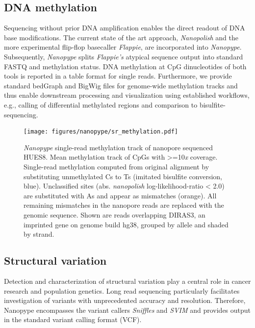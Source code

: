 \subsection{DNA methylation}
\label{subsec:nanopype:methylation}
Sequencing without prior DNA amplification enables the direct readout of DNA base modifications. The current state of the art approach, \textit{Nanopolish} \cite{Simpson2017} and the more experimental flip-flop basecaller \textit{Flappie}, are incorporated into \textit{Nanopype}. Subsequently, \textit{Nanopype} splits \textit{Flappie’s} atypical sequence output into standard FASTQ and methylation status. DNA methylation at CpG dinucleotides of both tools is reported in a table format for single reads. Furthermore, we provide standard bedGraph and BigWig files for genome-wide methylation tracks and thus enable downstream processing and visualization using established workflows, e.g., calling of differential methylated regions and comparison to bisulfite-sequencing.

\begin{figure}[h]
	\centering
	\texttt{[image: figures/nanopype/sr\_methylation.pdf]}
	\captionsetup{format=plain}
	\caption[Nanopype single read methylation track]{\textit{Nanopype} single-read methylation track of nanopore sequenced HUES8. Mean methylation track of CpGs with >=10\textit{x} coverage. Single-read methylation computed from original alignment by substituting unmethylated Cs to Ts (imitated bisulfite conversion, blue). Unclassified sites (abs. \textit{nanopolish} log-likelihood-ratio < 2.0) are substituted with As and appear as mismatches (orange). All remaining mismatches in the nanopore reads are replaced with the genomic sequence. Shown are reads overlapping DIRAS3, an imprinted gene on genome build hg38, grouped by allele and shaded by strand.}
	\label{fig:nanopype:sr_methylation}
\end{figure}


\subsection{Structural variation}
\label{subsec:nanopype:sv}
Detection and characterization of structural variation play a central role in cancer research and population genetics. Long read sequencing particularly facilitates investigation of variants with unprecedented accuracy and resolution. Therefore, Nanopype encompasses the variant callers \textit{Sniffles} \cite{Sedlazeck2018} and \textit{SVIM} \cite{Heller2019} and provides output in the standard variant calling format (VCF).


